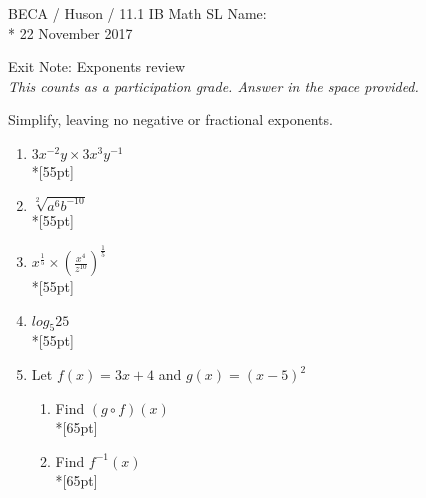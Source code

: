 \documentclass[]{book}
\begin{document}
\noindent BECA / Huson / 11.1 IB Math SL \hspace{2in} Name:\\*
22 November 2017
\begin{center}
{\Large Exit Note: Exponents review}\\
\textit{This counts as a participation grade. Answer in the space provided.}
\end{center}

Simplify, leaving no negative or fractional exponents.


\begin{enumerate}

\item $3x^{-2}y \times 3x^3 y^{-1}$\\*[55pt]
\item $\sqrt[2]{a^6 b^{-10}}$\\*[55pt]
\item $\displaystyle x^{\frac{1}{5}} \times (\frac{x^4}{z^{10}})^{\frac{1}{5}}$\\*[55pt]
\item $log_5 25$\\*[55pt]

\newpage
\item Let $f(x) = 3x+4$ and $g(x)=(x-5)^2$
\begin{enumerate}
    \item Find $(g \circ f)(x)$\\*[65pt]
    \item Find $f^{-1}(x)$\\*[65pt]
\end{enumerate}
\end{enumerate}
\end{document}
